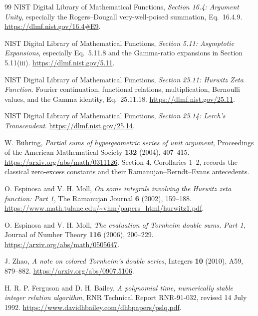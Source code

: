 \documentclass[11pt,a4paper]{article}
\numberwithin{equation}{section}
\theoremstyle{definition}
\theoremstyle{remark}
\begin{document}
\begin{thebibliography}{99}
NIST Digital Library of Mathematical Functions,
\emph{Section 16.4: Argument Unity}, especially the Rogers--Dougall
very-well-poised summation, Eq.~16.4.9.
\url{https://dlmf.nist.gov/16.4#E9}.

NIST Digital Library of Mathematical Functions,
\emph{Section 5.11: Asymptotic Expansions}, especially Eq.~5.11.8
and the Gamma-ratio expansions in Section 5.11(iii).
\url{https://dlmf.nist.gov/5.11}.

NIST Digital Library of Mathematical Functions,
\emph{Section 25.11: Hurwitz Zeta Function}.
Fourier continuation, functional relations, multiplication,
Bernoulli values, and the Gamma identity, Eq.~25.11.18.
\url{https://dlmf.nist.gov/25.11}.

NIST Digital Library of Mathematical Functions,
\emph{Section 25.14: Lerch's Transcendent}.
\url{https://dlmf.nist.gov/25.14}.

W. B\"uhring,
\emph{Partial sums of hypergeometric series of unit argument},
Proceedings of the American Mathematical Society \textbf{132}
(2004), 407--415.
\url{https://arxiv.org/abs/math/0311126}.
Section 4, Corollaries 1--2, records the classical zero-excess
constants and their Ramanujan--Berndt--Evans antecedents.

O. Espinosa and V. H. Moll,
\emph{On some integrals involving the Hurwitz zeta function: Part 1},
The Ramanujan Journal \textbf{6} (2002), 159--188.
\url{https://www.math.tulane.edu/~vhm/papers_html/hurwitz1.pdf}.

O. Espinosa and V. H. Moll,
\emph{The evaluation of Tornheim double sums. Part 1},
Journal of Number Theory \textbf{116} (2006), 200--229.
\url{https://arxiv.org/abs/math/0505647}.

J. Zhao,
\emph{A note on colored Tornheim's double series},
Integers \textbf{10} (2010), A59, 879--882.
\url{https://arxiv.org/abs/0907.5106}.

H. R. P. Ferguson and D. H. Bailey,
\emph{A polynomial time, numerically stable integer relation algorithm},
RNR Technical Report RNR-91-032, revised 14 July 1992.
\url{https://www.davidhbailey.com/dhbpapers/pslq.pdf}.

\end{thebibliography}
\end{document}
